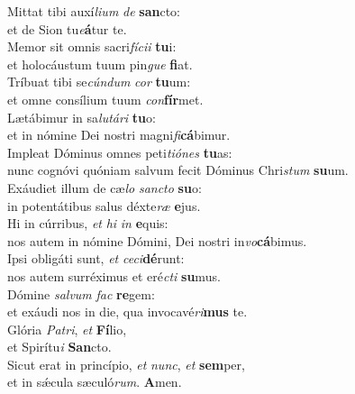 \evenverse Mittat tibi auxí\textit{li}\textit{um} \textit{de} \textbf{san}cto:~\*\\
\evenverse et de Sion tu\textit{e}\textbf{á}tur te.\\
\oddverse Memor sit omnis sacri\textit{fí}\textit{ci}\textit{i} \textbf{tu}i:~\*\\
\oddverse et holocáustum tuum pin\textit{gue} \textbf{fi}at.\\
\evenverse Tríbuat tibi se\textit{cún}\textit{dum} \textit{cor} \textbf{tu}um:~\*\\
\evenverse et omne consílium tuum \textit{con}\textbf{fír}met.\\
\oddverse Lætábimur in sa\textit{lu}\textit{tá}\textit{ri} \textbf{tu}o:~\*\\
\oddverse et in nómine Dei nostri magni\textit{fi}\textbf{cá}bimur.\\
\evenverse Impleat Dóminus omnes peti\textit{ti}\textit{ó}\textit{nes} \textbf{tu}as:~\*\\
\evenverse nunc cognóvi quóniam salvum fecit Dóminus Chri\textit{stum} \textbf{su}um.\\
\oddverse Exáudiet illum de cæ\textit{lo} \textit{san}\textit{cto} \textbf{su}o:~\*\\
\oddverse in potentátibus salus déxte\textit{ræ} \textbf{e}jus.\\
\evenverse Hi in cúrribus, \textit{et} \textit{hi} \textit{in} \textbf{e}quis:~\*\\
\evenverse nos autem in nómine Dómini, Dei nostri in\textit{vo}\textbf{cá}bimus.\\
\oddverse Ipsi obligáti sunt, \textit{et} \textit{ce}\textit{ci}\textbf{dé}runt:~\*\\
\oddverse nos autem surréximus et eré\textit{cti} \textbf{su}mus.\\
\evenverse Dómine \textit{sal}\textit{vum} \textit{fac} \textbf{re}gem:~\*\\
\evenverse et exáudi nos in die, qua invocavé\textit{ri}\textbf{mus} te.\\
\oddverse Glória \textit{Pa}\textit{tri}, \textit{et} \textbf{Fí}lio,~\*\\
\oddverse et Spirítu\textit{i} \textbf{San}cto.\\
\evenverse Sicut erat in princípio, \textit{et} \textit{nunc}, \textit{et} \textbf{sem}per,~\*\\
\evenverse et in sǽcula sæculó\textit{rum}. \textbf{A}men.\\
